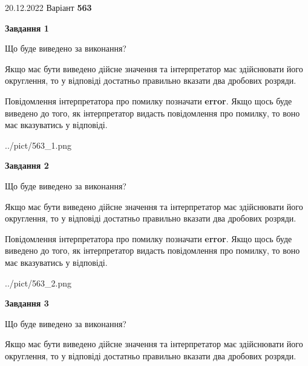 \documentclass[12pt, ukrainian]{article}
\begin{document}
{20.12.2022 Варіант \No \textbf { 563 }\par}
{
\begin {Large}

{\begin {center}\textbf{Завдання 1}\end {center}}\par
Що буде виведено за виконання? \par

Якщо має бути виведено дійсне значення та інтерпретатор має здійснювати його округлення, 
то у відповіді достатньо правильно вказати два дробових розряди.

Повідомлення інтерпретатора про помилку позначати \textbf{error}.
Якщо щось буде виведено до того, як інтерпретатор видасть повідомлення про помилку, 
то воно має вказуватись у відповіді. \par

\begin{center}
	{../pict/563_1.png}
\end{center}
\newpage

{\begin {center}\textbf{Завдання 2}\end {center}}\par
Що буде виведено за виконання? \par

Якщо має бути виведено дійсне значення та інтерпретатор має здійснювати його округлення, 
то у відповіді достатньо правильно вказати два дробових розряди.

Повідомлення інтерпретатора про помилку позначати \textbf{error}.
Якщо щось буде виведено до того, як інтерпретатор видасть повідомлення про помилку, 
то воно має вказуватись у відповіді. \par

\begin{center}
	{../pict/563_2.png}
\end{center}
\newpage

{\begin {center}\textbf{Завдання 3}\end {center}}\par
Що буде виведено за виконання? \par

Якщо має бути виведено дійсне значення та інтерпретатор має здійснювати його округлення, 
то у відповіді достатньо правильно вказати два дробових розряди.


\end{Large}}
\end{document}
